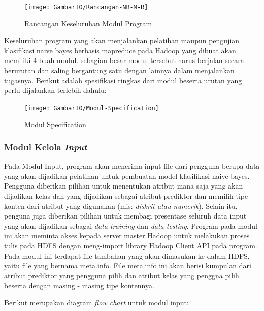 \begin{figure}[ht]
	\centering
	\texttt{[image: GambarIO/Rancangan-NB-M-R]}
	\caption[Rancangan Keseluruhan Modul Program]{Rancangan Keseluruhan Modul Program}
	\label{fig:Rancangan Keseluruhan Modul Program}
\end{figure}

Keseluruhan program yang akan menjalankan pelatihan maupun pengujian klasifikasi naive bayes berbasis mapreduce pada Hadoop yang dibuat akan memiliki 4 buah modul. sebagian besar modul tersebut harus berjalan secara berurutan dan saling bergantung satu dengan lainnya dalam menjalankan tugasnya. Berikut adalah spesifikasi ringkas dari modul beserta urutan yang perlu dijalankan terlebih dahulu: 

\begin{figure}[H]
	\centering
	\texttt{[image: GambarIO/Modul-Specification]}
	\caption[Modul-Specification]{Modul Specification}
	\label{fig:Modul Specification}
\end{figure}

\subsubsection{Modul Kelola \textit{Input}}

Pada Modul Input, program akan menerima input file dari pengguna berupa data yang akan dijadikan pelatihan untuk pembuatan model klasifikasi naive bayes. Pengguna diberikan pilihan untuk menentukan atribut mana saja yang akan dijadikan kelas dan yang dijadikan sebagai atribut prediktor dan memilih tipe konten dari atribut yang digunakan (mis: \textit{diskrit atau numerik}). Selain itu, penguna juga diberikan pilihan untuk membagi presentase seluruh data input yang akan dijadikan sebagai \textit{data training} dan \textit{data testing}. Program pada modul ini akan meminta akses kepada server master Hadoop untuk melakukan proses tulis pada HDFS dengan meng-import library Hadoop Client API pada program. Pada modul ini terdapat file tambahan yang akan dimasukan ke dalam HDFS, yaitu file yang bernama meta.info. File meta.info ini akan berisi kumpulan dari atribut prediktor yang pengguna pilih dan atribut kelas yang penggna pilih beserta dengan masing - masing tipe kontennya.

Berikut merupakan diagram \textit{flow chart} untuk modul input:

